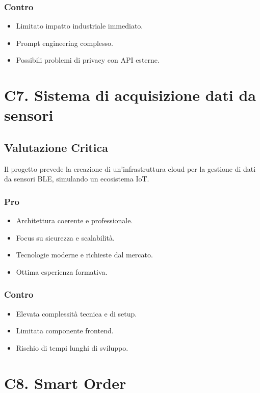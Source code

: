 \documentclass[a4paper, 11pt, oneside]{scrartcl} %
\begin{document}
\subsubsection*{Contro}
\begin{itemize}
    \item Limitato impatto industriale immediato.
    \item Prompt engineering complesso.
    \item Possibili problemi di privacy con API esterne.
\end{itemize}

\section{C7. Sistema di acquisizione dati da sensori}
\subsection*{Valutazione Critica}
Il progetto prevede la creazione di un’infrastruttura cloud per la gestione di dati da sensori BLE, simulando un ecosistema IoT.

\subsubsection*{Pro}
\begin{itemize}
    \item Architettura coerente e professionale.
    \item Focus su sicurezza e scalabilità.
    \item Tecnologie moderne e richieste dal mercato.
    \item Ottima esperienza formativa.
\end{itemize}

\subsubsection*{Contro}
\begin{itemize}
    \item Elevata complessità tecnica e di setup.
    \item Limitata componente frontend.
    \item Rischio di tempi lunghi di sviluppo.
\end{itemize}

\section{C8. Smart Order}
\end{document}
